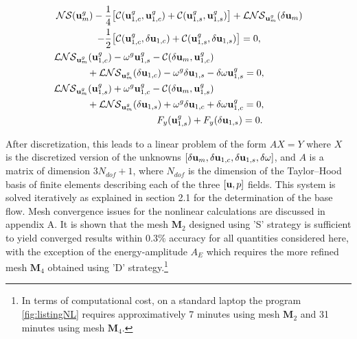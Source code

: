 \documentclass[twocolumn,10pt]{asme2ej}
\begin{document}
\begin{subequations}

\begin{align}
{\cal NS}(  {\bf u }_m^g ) - \frac{1}{4} &\big[ {\cal C}( {\bf u }_{1,c}^g,{\bf u }_{1,c}^g) +  {\cal C}( {\bf u }_{1,s}^g,{\bf u }_{1,s}^g) \big]+ {\cal LNS}_{{\bf u }_m^g}(\delta {\bf u }_m) \nonumber \\
-\frac{1}{2}& \big[ {\cal C}( {\bf u }_{1,c}^g,\delta {\bf u }_{1,c}) +  {\cal C}( {\bf u }_{1,s}^g,\delta {\bf u }_{1,s}) \big] = 0, \label{HB_1} \\
{\cal LNS}_{{\bf u }_m^g}( {\bf u }_{1,c}^g)& - \omega^g {\bf u }_{1,s}^g -  {\cal C}( \delta {\bf u }_{m}, {\bf u }_{1,c}^g) \nonumber \\
&\hspace{-0.9cm}+{\cal LNS}_{{\bf u }_m^g}( \delta {\bf u }_{1,c})  - \omega^g \delta {\bf u }_{1,s}  
 - \delta \omega {\bf u }_{1,s}^g = 0 , \label{HB_2}\\
{\cal LNS}_{{\bf u }_m^g}({\bf u }_{1,s}^g)& + \omega^g {\bf u }_{1,c}^g -  {\cal C}( \delta {\bf u }_{m}, {\bf u }_{1,s}^g) \nonumber \\
&\hspace{-0.9cm}+{\cal LNS}_{{\bf u }_m^g}( \delta {\bf u }_{1,s}) + \omega^g \delta {\bf u }_{1,c} +  \delta \omega {\bf u }_{1,c}^g= 0 , \label{HB_3} \\
&\hspace{1.65cm} F_y({\bf u }_{1,s}^g) + F_y(\delta {\bf u }_{1,s}) = 0. 
\end{align}
\end{subequations}

After discretization, this leads to a linear problem of the form $A X = Y$ where $X$ is the discretized version of the unknowns  $[\delta {\bf u }_m, \delta {\bf u }_{1,c}, \delta {\bf u }_{1,s}, \delta \omega]$, and $A$ is a matrix of dimension $3 N_{dof} +1$, where $N_{dof}$ is the dimension of the Taylor--Hood basis of finite elements describing each of the three $[{\bf u},p]$ fields. This system is solved iteratively as explained in section 2.1 for the determination of the base flow. %
Mesh convergence issues for the nonlinear calculations are discussed in appendix A. It is shown that the mesh $\mathbf{M}_2$ designed using 'S' strategy is sufficient to yield converged results within $0.3\%$ accuracy for all quantities considered here, with the exception of the energy-amplitude $A_E$ which requires the more refined mesh $\mathbf{M}_4$ obtained using 'D' strategy.\footnote{In terms of computational cost, on a standard laptop the program  \ref{fig:listingNL} requires approximatively 7 minutes using  mesh $\mathbf{M}_2$ and 31 minutes using mesh $\mathbf{M}_4$.} 
 
\end{document}
